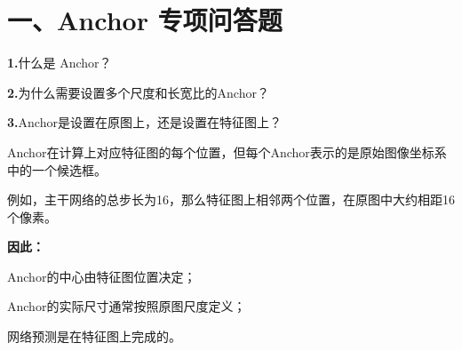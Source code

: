 \documentclass[UTF8,openany,oneside,zihao=-4,fontset=windows]{ctexbook}
\newif\ifshowsolutions
\newcommand{\Question}[2]{%
  \par\Needspace{4\baselineskip}\medskip
  \noindent\textbf{\color{MVBlue}#1}\quad #2\par
}
\newenvironment{AnswerBox}{\begin{tcolorbox}[breakable,colback=MVLight,colframe=MVBlue!45,title={参考答案},fonttitle=\bfseries,boxrule=0.55pt,arc=1.5mm,left=2mm,right=2mm,top=1.5mm,bottom=1.5mm]}{\end{tcolorbox}}
\newcommand{\PracticeSpace}[1]{\ifshowsolutions\else\par\vspace{#1}\par\fi}
\begin{document}
\section{一、Anchor 专项问答题}
\Question{1.}{什么是 Anchor？}
\ifshowsolutions
\begin{AnswerBox}
\par Anchor是在特征图的每一个空间位置预先设置的一组参考框。
\par\noindent\textbf{这些参考框通常具有不同的：}
\par\noindent\textbullet\quad 尺寸；
\par 长宽比。
\par\noindent\textbf{RPN以Anchor为基础，预测：}
\par\noindent\textbullet\quad 该Anchor属于前景还是背景；
\par 该Anchor应如何平移和缩放，才能更接近真实目标框。
\par Anchor不是最终检测框，而是边界框回归的初始参考。
\end{AnswerBox}
\else
\PracticeSpace{2.4cm}
\fi
\Question{2.}{为什么需要设置多个尺度和长宽比的Anchor？}
\ifshowsolutions
\begin{AnswerBox}
\par\noindent\textbf{图像中的目标可能具有不同的大小和形状，例如：}
\par\noindent\textbullet\quad 行人通常较高、较窄；
\par\noindent\textbullet\quad 汽车通常较宽；
\par\noindent\textbullet\quad 远处目标较小；
\par 近处目标较大。
\par 在同一个特征图位置设置不同尺度和长宽比的Anchor，可以使网络覆盖更多类型的目标框，提高候选框与真实目标的初始重合程度。
\end{AnswerBox}
\else
\PracticeSpace{2.4cm}
\fi
\Question{3.}{Anchor是设置在原图上，还是设置在特征图上？}
\ifshowsolutions
\begin{AnswerBox}
\par Anchor在计算上对应特征图的每个位置，但每个Anchor表示的是原始图像坐标系中的一个候选框。
\par 例如，主干网络的总步长为16，那么特征图上相邻两个位置，在原图中大约相距16个像素。
\par\noindent\textbf{因此：}
\par\noindent\textbullet\quad Anchor的中心由特征图位置决定；
\par\noindent\textbullet\quad Anchor的实际尺寸通常按照原图尺度定义；
\par 网络预测是在特征图上完成的。
\end{AnswerBox}
\end{document}
